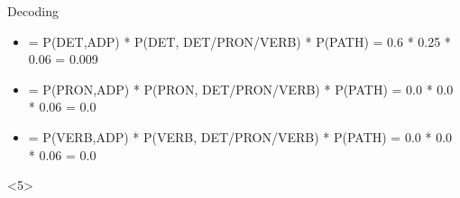 \documentclass{beamer}
\begin{document}
\begin{frame}{Decoding}
\begin{center}
\begin{onlyenv}

{\tiny
\begin{itemize}
  \item = P(DET,ADP) * P(DET, DET/PRON/VERB) * P(PATH) = 0.6 * 0.25 * 0.06 = 0.009
  \item = P(PRON,ADP) * P(PRON, DET/PRON/VERB) * P(PATH) = 0.0 * 0.0 * 0.06 = 0.0
  \item = P(VERB,ADP) * P(VERB, DET/PRON/VERB) * P(PATH) = 0.0 * 0.0 * 0.06 = 0.0
\end{itemize}
}

\end{onlyenv}


\begin{onlyenv}<5>


\end{onlyenv}
\end{center}
\end{frame}
\end{document}
